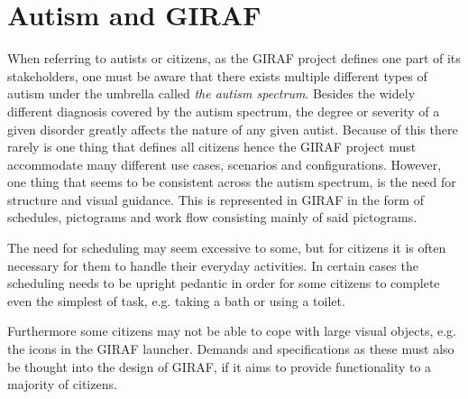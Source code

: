 \section{Autism and GIRAF}
When referring to autists or citizens, as the GIRAF project defines one part of its stakeholders, one must be aware that there exists multiple different types of autism under the umbrella called \textit{the autism spectrum}.
Besides the widely different diagnosis covered by the autism spectrum, the degree or severity of a given disorder greatly affects the nature of any given autist.
Because of this there rarely is one thing that defines all citizens hence the GIRAF project must accommodate many different use cases, scenarios and configurations.
However, one thing that seems to be consistent across the autism spectrum, is the need for structure and visual guidance.
This is represented in GIRAF in the form of schedules, pictograms and work flow consisting mainly of said pictograms.

The need for scheduling may seem excessive to some, but for citizens it is often necessary for them to handle their everyday activities.
In certain cases the scheduling needs to be upright pedantic in order for some citizens to complete even the simplest of task, e.g. taking a bath or using a toilet.

Furthermore some citizens may not be able to cope with large visual objects, e.g. the icons in the GIRAF launcher.
Demands and specifications as these must also be thought into the design of GIRAF, if it aims to provide functionality to a majority of citizens.
